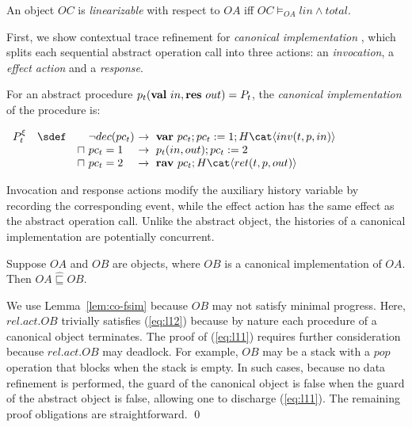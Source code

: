 \documentclass[11pt]{llncs}
\def \pctvar{pc_t}
\def \endbox{\hfill \qed}
\def \asgn  {{\;:=\;}}
\def \srefc  {\mathbin{\widehat{\sqsubseteq}}}
\def \var {{\bf var}\ }
\def \rav {{\bf rav}\ }
\def \val {{\bf val}\ }
\def \res {{\bf res}\ }
\newcommand{\refeqn}[1]{(\ref{#1})}
\newcommand{\reflem}[1]{Lem\-ma~\ref{#1}}
\begin{document}
\begin{definition}
  \label{def:intra-proc-cons}
  An object $OC$ is \emph{linearizable} with respect to $OA$ iff $OC
  \models_{OA} lin \land total$.
\end{definition}




First, we show contextual trace refinement for \emph{canonical
  implementation} \cite{Lyn96-DA,CDG05,SDW14}, which splits each
sequential abstract operation call into three actions: an
\emph{invocation}, a \emph{effect action} and a \emph{response}.
\begin{definition}
  For an abstract procedure $p_t(\val in, \res out) = P_t$, the
  \emph{canonical implementation} of the procedure is:\smallskip

  \hfill$\begin{array}{rcl}
    P^\xi_t & \sdef  &
    \begin{array}[t]{@{}l@{~}l@{~}l@{}}
      & \neg dec(\pctvar)  & \to\ \var \pctvar; \pctvar \asgn 1 ; H \cat \langle inv(t, p,
        in) \rangle
      \\
      \sqcap & \pctvar = 1 & \to\ p_t(in, out) ; \pctvar \asgn 2
      \\
      \sqcap & \pctvar = 2 & \to\ \rav  \pctvar ; H \cat \langle
                             ret(t, p, out) \rangle
    \end{array}
  \end{array}$\hfill{\ }
\end{definition}


Invocation and response actions modify the auxiliary
history variable by recording the corresponding event, while the
effect action has the same effect as the abstract operation
call. Unlike the abstract object, the histories of a canonical
implementation are potentially concurrent.













\begin{theorem}
  \label{thm:otr-can-lin}
  Suppose $OA$ and $OB$ are objects, where $OB$ is a canonical
  implementation of $OA$. Then $OA \srefc OB$.
\end{theorem}
We use \reflem{lem:co-fsim} because $OB$ may not satisfy minimal
progress. Here, $rel.act.OB$ trivially satisfies \refeqn{eq:l12}
because by nature each procedure of a canonical object terminates. The
proof of \refeqn{eq:l11} requires further consideration because
$rel.act.OB$ may deadlock. For example, $OB$ may be a stack with a
$pop$ operation that blocks when the stack is empty. In such cases,
because no data refinement is performed, the guard of the canonical
object is false when the guard of the abstract object is false,
allowing one to discharge \refeqn{eq:l11}. The remaining proof
obligations are straightforward. \endbox\smallskip
\end{document}
